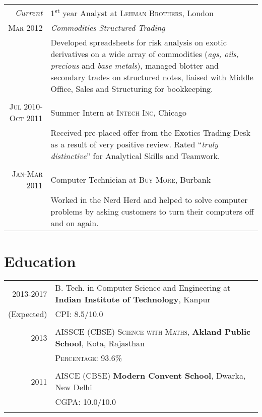 \documentclass[a4paper,10pt]{article} %
\begin{document}
\begin{tabular}{r|p{11cm}}
\emph{Current} & 1\textsuperscript{st} year Analyst at \textsc{Lehman Brothers}, London \\
\textsc{Mar 2012} & \emph{Commodities Structured Trading}\\ 
& \footnotesize{Developed spreadsheets for risk analysis on exotic derivatives on a wide array of commodities (\textit{ags, oils, precious} and \textit{base metals}), managed blotter and secondary trades on structured notes, liaised with Middle Office, Sales and Structuring for bookkeeping.}\\
\multicolumn{2}{c}{} \\


\textsc{Jul 2010-Oct 2011} & Summer Intern at \textsc{Intech Inc}, Chicago \emph{}\\
& \footnotesize{Received pre-placed offer from the Exotics Trading Desk as a result of very positive review. Rated ``\emph{truly distinctive}'' for Analytical Skills and Teamwork.}\\
\multicolumn{2}{c}{} \\


\textsc{Jan-Mar 2011} & Computer Technician at \textsc{Buy More}, Burbank \emph{}\\
& \footnotesize{Worked in the Nerd Herd and helped to solve computer problems by asking customers to turn their computers off and on again.}
\end{tabular}


\section{Education}

\begin{tabular}{rl}
2013-2017 & B. Tech. in Computer Science and Engineering at \textbf{Indian Institute of Technology}, Kanpur\\
(Expected) & \textsc{CPI}: 8.5/10.0\\
&\\


2013 & AISSCE (CBSE) \textsc{Science with Maths}, \textbf{Akland Public School}, Kota, Rajasthan\\
&\normalsize \textsc{Percentage}: 93.6\%\\
&\\


2011 & AISCE (CBSE) \textbf{Modern Convent School}, Dwarka, New Delhi\\
&\normalsize \textsc{CGPA}: 10.0/10.0\\
&\\
\end{tabular}
\end{document}
